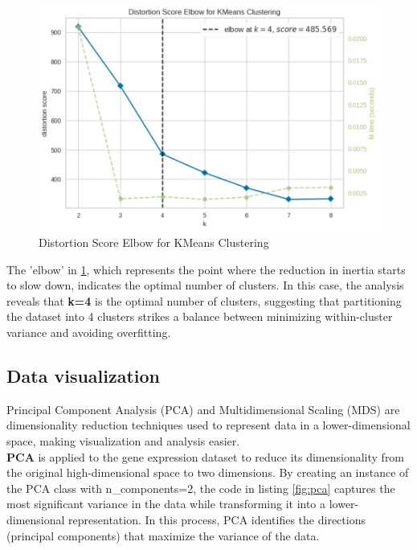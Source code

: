 \documentclass{article}
\begin{document}
\begin{figure}[H]
	\centering
	\includegraphics[width=.7\textwidth]{images/elbow.png}
	\caption{Distortion Score Elbow for KMeans Clustering}
	\label{fig:elbow}
\end{figure}



 The 'elbow' in \ref{fig:elbow}, which represents the point where the reduction in inertia starts to slow down, indicates the optimal number of clusters. In this case, the analysis reveals that \textbf{k=4} is the optimal number of clusters, suggesting that partitioning the dataset into 4 clusters strikes a balance between minimizing within-cluster variance and avoiding overfitting. 
\\

\subsection{Data visualization}
Principal Component Analysis (PCA) and Multidimensional Scaling (MDS) are dimensionality reduction techniques used to represent data in a lower-dimensional space, making visualization and analysis easier.
\\

\textbf{PCA} is applied to the gene expression dataset to reduce its dimensionality from the original high-dimensional space to two dimensions. By creating an instance of the PCA class with n\_components=2, the code in listing \ref{fig:pca} captures the most significant variance in the data while transforming it into a lower-dimensional representation. In this process, PCA identifies the directions (principal components) that maximize the variance of the data.
\\
\end{document}
